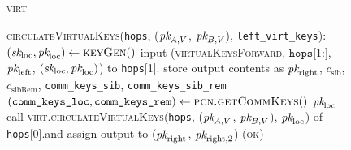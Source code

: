 \begin{figure}[H]
\begin{processbox}{\textsc{virt}}
\begin{algorithmic}[1]
      \State \textsc{circulateVirtualKeys}(\texttt{hops}, ($\textit{pk}_{A, V}$, $\textit{pk}_{B,
      V}$), \texttt{left\_virt\_keys}):
      \Indent
        \State {}
        \State $(\textit{sk}_{\mathrm{loc}}, \textit{pk}_{\mathrm{loc}}) \gets
        \textsc{keyGen}()$
         
           
            \State input (\textsc{virtualKeysForward}, $\texttt{hops}$[1:],
            $\textit{pk}_{\mathrm{left}}$, $(\textit{sk}_{\mathrm{loc}}, \textit{pk}_{\mathrm{loc}})$) to
            \texttt{hops}[1].\alice{} 
            \State {}
            \State {}
            \State {}
            \State {}
            \State store output contents as $\textit{pk}_{\mathrm{right}}$,
            $c_{\mathrm{sib}}$, $c_{\mathrm{sibRem}}$, \texttt{comm\_keys\_sib},
            \texttt{comm\_keys\_sib\_rem}
            \State $(\texttt{comm\_keys\_loc}, \texttt{comm\_keys\_rem}) \gets
            \textsc{pcn.getCommKeys}()$
          \EndIf
          \State \Return $\textit{pk}_{\mathrm{loc}}$
        \Else \: 
          \State call \textsc{virt.circulateVirtualKeys}(\texttt{hops}, ($\textit{pk}_{A,
          V}$, $\textit{pk}_{B, V}$), $\textit{pk}_{\mathrm{loc}}$) of \texttt{hops}[0].\bob and
          assign output to ($\textit{pk}_{\mathrm{right}}$, $\textit{pk}_{\mathrm{right}, 2}$)
          \State \Return (\textsc{ok})
        \EndIf
      \EndIndent
    \end{algorithmic}
  \end{processbox}
  \caption{}
  \label{code:virtual-layer:keys}
\end{figure}

